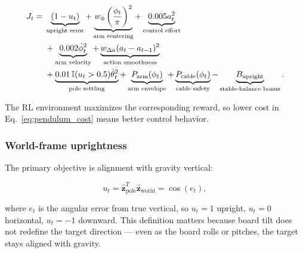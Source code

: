 \documentclass[9pt]{extarticle}
\begin{document}
\begin{align}
J_t ={}&
\underbrace{(1-u_t)}_{\text{upright error}}
+
\underbrace{w_{\phi}
\left(\frac{\phi_t}{\pi}\right)^2}_{\text{arm centering}}
+
\underbrace{0.005a_t^2}_{\text{control effort}}
\notag\\
&+
\underbrace{0.002\dot{\phi}_t^2}_{\text{arm velocity}}
+
\underbrace{w_{\Delta a}
(a_t-a_{t-1})^2}_{\text{action smoothness}}
\notag\\
&+
\underbrace{
0.01\,\mathbb{I}(u_t>0.5)\dot{\theta}_t^2
}_{\text{pole settling}}
+
\underbrace{P_{\mathrm{arm}}(\phi_t)}_{\text{arm envelope}}
+
\underbrace{P_{\mathrm{cable}}(\phi_t)}_{\text{cable safety}}
-
\underbrace{B_{\mathrm{upright}}}_{\text{stable-balance bonus}} .
\label{eq:pendulum_cost}
\end{align}

The RL environment maximizes the corresponding reward, so lower cost in
Eq.~\eqref{eq:pendulum_cost} means better control behavior.

\subsubsection*{World-frame uprightness}

The primary objective is alignment with gravity vertical:

\begin{equation}
u_t =
\hat{\mathbf z}_{\mathrm{pole}}^{T}
\hat{\mathbf z}_{\mathrm{world}}
=
\cos(e_t),
\label{eq:uprightness}
\end{equation}

where $e_t$ is the angular error from true vertical, so
$u_t=1$ upright, $u_t=0$ horizontal, $u_t=-1$ downward. This definition
matters because board tilt does not redefine the target direction — even
as the board rolls or pitches, the target stays aligned with gravity.
\end{document}
